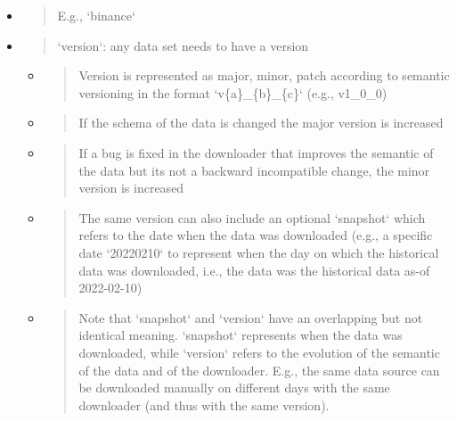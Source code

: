 \documentclass[11pt, reqno]{amsart}
\begin{document}
\begin{itemize}
\item
  \begin{quote}
  E.g., `binance`
  \end{quote}
\end{itemize}

\begin{itemize}
\item
  \begin{quote}
  `version`: any data set needs to have a version
  \end{quote}

  \begin{itemize}
  \item
    \begin{quote}
    Version is represented as major, minor, patch according to semantic
    versioning in the format `v\{a\}\_\{b\}\_\{c\}` (e.g., v1\_0\_0)
    \end{quote}
  \item
    \begin{quote}
    If the schema of the data is changed the major version is increased
    \end{quote}
  \item
    \begin{quote}
    If a bug is fixed in the downloader that improves the semantic of
    the data but it\textquotesingle s not a backward incompatible
    change, the minor version is increased
    \end{quote}
  \item
    \begin{quote}
    The same version can also include an optional `snapshot` which
    refers to the date when the data was downloaded (e.g., a specific
    date `20220210` to represent when the day on which the historical
    data was downloaded, i.e., the data was the historical data as-of
    2022-02-10)
    \end{quote}
  \item
    \begin{quote}
    Note that `snapshot` and `version` have an overlapping but not
    identical meaning. `snapshot` represents when the data was
    downloaded, while `version` refers to the evolution of the semantic
    of the data and of the downloader. E.g., the same data source can be
    downloaded manually on different days with the same downloader (and
    thus with the same version).
    \end{quote}
  \end{itemize}
\end{itemize}
\end{document}
